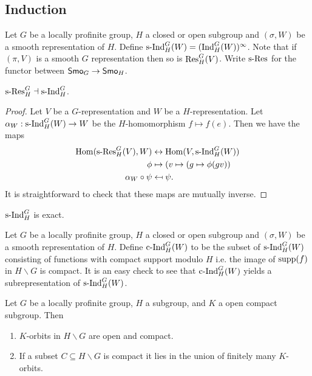 \documentclass{memoir}
\begin{document}
\subsection{Induction}
\begin{definition}
    Let $G$ be a locally profinite group, $H$ a closed or open subgroup and $(\sigma,W)$ be a smooth representation of $H$.
    Define $\text{s-Ind}_H^G(W) = (\text{Ind}_H^G(W))^\infty$.
    Note that if $(\pi,V)$ is a smooth $G$ representation then so is $\text{Res}_H^G(V)$.
    Write $\text{s-Res}$ for the functor between ${\normalfont\mathsf{Smo}}_G\to{\normalfont\mathsf{Smo}}_H$.
\end{definition}
\begin{proposition}
    $\text{s-Res}_H^G\dashv \text{s-Ind}_H^G$.
\end{proposition}
\begin{proof}
    Let $V$ be a $G$-representation and $W$ be a $H$-representation.
    Let $\alpha_W:\text{s-Ind}_H^G(W)\to W$ be the $H$-homomorphism $f\mapsto f(e)$.
    Then we have the maps
    \begin{align}
        \operatorname{Hom}(\text{s-Res}_H^G(V),W) &\leftrightarrow \operatorname{Hom}(V,\text{s-Ind}_H^G(W)) \\
        \phi &\mapsto  (v\mapsto (g\mapsto \phi(gv)) \\
        \alpha_W\circ\psi &\mapsfrom \psi.
    \end{align}
    It is straightforward to check that these maps are mutually inverse.
\end{proof}
\begin{proposition}
    $\text{s-Ind}_H^G$ is exact.
\end{proposition}
\begin{definition}
    Let $G$ be a locally profinite group, $H$ a closed or open subgroup and $(\sigma,W)$ be a smooth representation of $H$.
    Define $\text{c-Ind}_H^G(W)$ to be the subset of $\text{s-Ind}_H^G(W)$ consisting of functions with compact support modulo $H$ i.e. the image of $\text{supp}(f)$ in $H\backslash G$ is compact.
    It is an easy check to see that $\text{c-Ind}_H^G(W)$ yields a subrepresentation of $\text{s-Ind}_H^G(W)$.
\end{definition}
\begin{lemma}
    Let $G$ be a locally profinite group, $H$ a subgroup, and $K$ a open compact subgroup.
    Then 
    \begin{enumerate}
        \item $K$-orbits in $H\backslash G$ are open and compact.
        \item If a subset $C\subseteq H\backslash G$ is compact it lies in the union of finitely many $K$-orbits.
    \end{enumerate}
\end{lemma}
\end{document}
